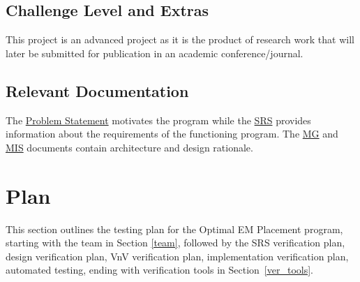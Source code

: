\documentclass[12pt, titlepage]{article}
\begin{document}
\subsection{Challenge Level and Extras}
This project is an advanced project as it is the product of research work that will later be submitted for publication in an academic conference/journal.  

\subsection{Relevant Documentation}
The \href{https://github.com/husseinsd1/optimal-em-arrangement/blob/main/docs/ProblemStatementAndGoals/ProblemStatement.pdf}{Problem Statement} motivates the program while the \href{https://github.com/husseinsd1/optimal-em-arrangement/blob/main/docs/SRS/SRS.pdf}{SRS} provides information about the requirements of the functioning program. The \href{https://github.com/husseinsd1/optimal-em-arrangement/blob/main/docs/Design/SoftArchitecture/MG.pdf}{MG} and \href{https://github.com/husseinsd1/optimal-em-arrangement/blob/main/docs/Design/SoftDetailedDes/MIS.pdf}{MIS} documents contain architecture and design rationale. 

\section{Plan}
This section outlines the testing plan for the Optimal EM Placement program, starting with the team in Section \ref{team}, followed by the SRS verification plan, design verification plan, VnV verification plan, implementation verification plan, automated testing, ending with verification tools in Section~\ref{ver_tools}.
\end{document}
